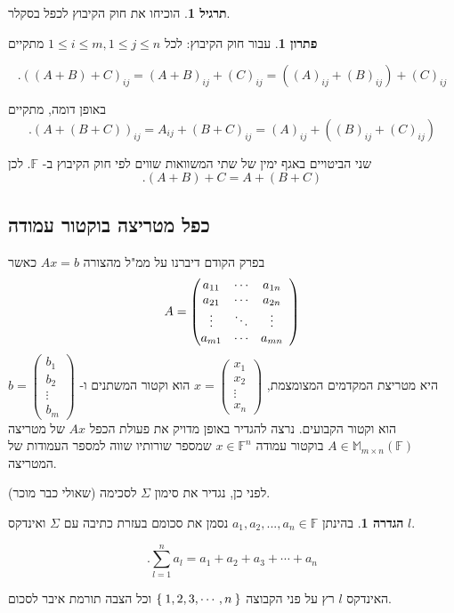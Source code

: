 \documentclass[12pt]{report}
\theoremstyle{plain}
\theoremstyle{definition}
\newtheorem{definition}[theorem]{הגדרה}
\newtheorem{exercise}{תרגיל}[chapter]
\newtheorem*{solution}{פתרון}
\newcommand{\F}{\mathbb{F}}
\newcommand{\M}{\mathbb{M}}
\newcommand{\0}{\mathbf{0}}
\begin{document}
\begin{exercise}
הוכיחו את חוק הקיבוץ לכפל בסקלר.
\end{exercise}

\begin{solution}
עבור חוק הקיבוץ: לכל 
$1\leq i\leq m, 1\leq j\leq n$
מתקיים 

$$
.((A+B)+C)_{ij}=(A+B)_{ij}+(C)_{ij}=((A)_{ij}+(B)_{ij})+(C)_{ij}
$$

באופן דומה, מתקיים
$$
.(A+(B+C))_{ij}=A_{ij}+(B+C)_{ij}=(A)_{ij}+((B)_{ij}+(C)_{ij})
$$

שני הביטויים באגף ימין של שתי המשוואות שווים לפי חוק הקיבוץ ב-
$\F$.
לכן
$$.(A+B)+C=A+(B+C)$$
\end{solution}

\subsection{כפל מטריצה בוקטור עמודה}

בפרק הקודם דיברנו על ממ"ל מהצורה
$Ax=b$
כאשר
$$
A=\left( \begin{array}{@{}cccc}
	a_{11} & \cdots & a_{1n}  \\
	a_{21} & \cdots & a_{2n} \\
	\vdots & \ddots & \vdots  \\
	a_{m1}  & \cdots & a_{mn} 
\end{array} \right)
$$
היא מטריצת המקדמים המצומצמת, 
$x=\begin{pmatrix}x_1\\
x_2\\
\vdots\\
x_n
\end{pmatrix}$
הוא וקטור המשתנים ו-
$b=\begin{pmatrix}b_1\\
b_2\\
\vdots\\
b_m
\end{pmatrix}$
הוא וקטור הקבועים. 
נרצה להגדיר באופן מדויק את פעולת הכפל 
$Ax$
של מטריצה 
$A\in\M_{m\times n}(\F)$
בוקטור עמודה
$x\in\F^n$
שמספר שורותיו שווה למספר העמודות של המטריצה.

לפני כן, נגדיר את סימון 
$\Sigma$
לסכימה (שאולי כבר מוכר).

\begin{definition}
בהינתן
$a_1,a_2,...,a_n\in\F$
נסמן את סכומם בעזרת כתיבה עם
$\Sigma$
ואינדקס
$l$.

$$
.\sum_{l=1}^n a_l=a_1+a_2+a_3+\cdots+a_n
$$

האינדקס
$l$
רץ על פני הקבוצה
$\Set{1,2,3,\cdots,n}$
וכל הצבה תורמת איבר לסכום.

\end{definition}
\end{document}
